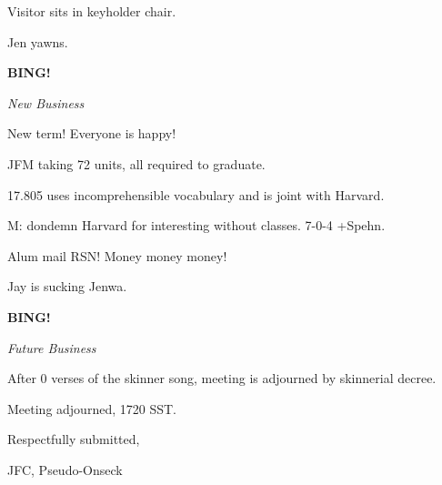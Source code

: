 \documentclass[12pt]{article}
\newcommand{\bing}{{\bf BING!} }
\newcommand{\goto}[1]{\bing \vskip 12pt \centerline{{\em{#1}}}}
\begin{document}
Visitor sits in keyholder chair.

Jen yawns.

\goto{New Business}

New term! Everyone is happy!

JFM taking 72 units, all required to graduate.

17.805 uses incomprehensible vocabulary and is joint with Harvard.

M: dondemn Harvard for interesting without classes. 7-0-4 +Spehn.

Alum mail RSN! Money money money!

Jay is sucking Jenwa.

\goto{Future Business}

After 0 verses of the skinner song, meeting is adjourned by skinnerial decree.

\vspace{12pt}

\noindent
Meeting adjourned, 1720 SST.

\vspace{18pt}

\centerline{Respectfully submitted,}
\centerline{JFC, Pseudo-Onseck}
\end{document}
